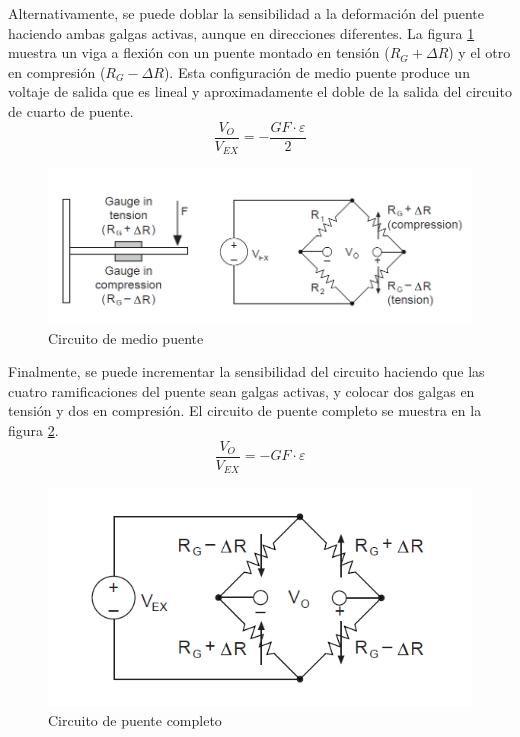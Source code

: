 Alternativamente, se puede doblar la sensibilidad a la deformación del puente haciendo 
ambas galgas activas, aunque en direcciones diferentes. La figura \ref{fig:half_bridge} 
muestra un viga a flexión con un puente montado en tensión ($R_G + \Delta R$) y el otro 
en compresión ($R_G - \Delta R$). Esta configuración de medio puente produce un voltaje 
de salida que es lineal y aproximadamente el doble de la salida del circuito de cuarto 
de puente. ~\cite{gageNI} \\

\begin{equation}
\frac{V_O}{V_{EX}} = - \frac{GF \cdot \varepsilon}{2}
\end{equation}

\begin{figure}[!h]
\centering
\includegraphics[scale=0.55]{src/ch2/half_bridge.png}
\caption{Circuito de medio puente}
\label{fig:half_bridge}
\end{figure}

Finalmente, se puede incrementar la sensibilidad del circuito haciendo que las cuatro 
ramificaciones del puente sean galgas activas, y colocar dos galgas en tensión y dos en 
compresión. El circuito de puente completo se muestra en la figura \ref{fig:full_bridge}. ~\cite{gageNI} \\

\begin{equation}
\frac{V_{O}}{V_{EX}} = -GF\cdot \varepsilon
\end{equation}

\begin{figure}[!h]
\centering
\includegraphics[scale=0.55]{src/ch2/full_bridge.png}
\caption{Circuito de puente completo}
\label{fig:full_bridge}
\end{figure}

